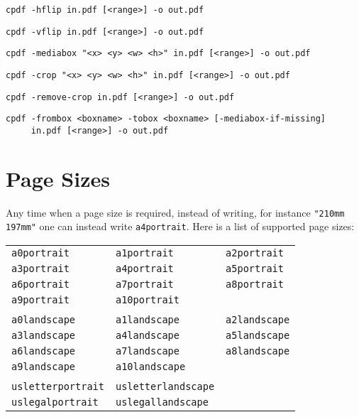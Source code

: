 \documentclass{book}
\newcommand{\smallgap}{\bigskip}
\begin{document}
\begin{framed}
  \vspace{1.5mm}
  \small\noindent\verb!cpdf -hflip in.pdf [<range>] -o out.pdf!

  \vspace{1.5mm}
  \small\noindent\verb!cpdf -vflip in.pdf [<range>] -o out.pdf!
  
  \vspace{1.5mm}
  \small\noindent\verb!cpdf -mediabox "<x> <y> <w> <h>" in.pdf [<range>] -o out.pdf!


  \vspace{1.5mm}
  \small\noindent\verb!cpdf -crop "<x> <y> <w> <h>" in.pdf [<range>] -o out.pdf!

  \vspace{1.5mm}
  \small\noindent\verb!cpdf -remove-crop in.pdf [<range>] -o out.pdf!


  \vspace{1.5mm}
  \small\noindent\verb!cpdf -frombox <boxname> -tobox <boxname> [-mediabox-if-missing]! \\
  \noindent\verb!     in.pdf [<range>] -o out.pdf!
  \end{framed}

  \section{Page Sizes}
  Any time when a page size is required, instead of writing, for instance \texttt{"210mm 197mm"} one can instead write \texttt{a4portrait}. Here is a list of supported page sizes:

{\small
  \smallgap
  \begin{tabular}{lll}
  \texttt{a0portrait} & \texttt{a1portrait} & \texttt{a2portrait} \\
  \texttt{a3portrait} & \texttt{a4portrait} & \texttt{a5portrait} \\
  \texttt{a6portrait} & \texttt{a7portrait} & \texttt{a8portrait} \\
  \texttt{a9portrait} & \texttt{a10portrait} & \\
  \\
  \texttt{a0landscape} & \texttt{a1landscape} & \texttt{a2landscape} \\
  \texttt{a3landscape} & \texttt{a4landscape} & \texttt{a5landscape} \\
  \texttt{a6landscape} & \texttt{a7landscape} & \texttt{a8landscape} \\
  \texttt{a9landscape} & \texttt{a10landscape} & \\
  \\
  \texttt{usletterportrait} & \texttt{usletterlandscape} & \\
  \texttt{uslegalportrait} & \texttt{uslegallandscape} &
  \end{tabular}
}
\end{document}
